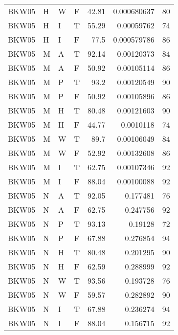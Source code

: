 \begin{table}[!htb]
{\begin{tabular}{llllrrr}
            BKW05    & H     & W     & F          & 42.81      & 0.000680637 & 80       \\
            BKW05    & H     & I     & T          & 55.29      & 0.00059762  & 74       \\
            BKW05    & H     & I     & F          & 77.5       & 0.000579786 & 86       \\
            BKW05    & M     & A     & T          & 92.14      & 0.00120373  & 84       \\
            BKW05    & M     & A     & F          & 50.92      & 0.00105114  & 86       \\
            BKW05    & M     & P     & T          & 93.2       & 0.00120549  & 90       \\
            BKW05    & M     & P     & F          & 50.92      & 0.00105896  & 86       \\
            BKW05    & M     & H     & T          & 80.48      & 0.00121603  & 90       \\
            BKW05    & M     & H     & F          & 44.77      & 0.0010118   & 74       \\
            BKW05    & M     & W     & T          & 89.7       & 0.00106049  & 84       \\
            BKW05    & M     & W     & F          & 52.92      & 0.00132608  & 86       \\
            BKW05    & M     & I     & T          & 62.75      & 0.00107346  & 92       \\
            BKW05    & M     & I     & F          & 88.04      & 0.00100088  & 92       \\
            BKW05    & N     & A     & T          & 92.05      & 0.177481    & 76       \\
            BKW05    & N     & A     & F          & 62.75      & 0.247756    & 92       \\
            BKW05    & N     & P     & T          & 93.13      & 0.19128     & 72       \\
            BKW05    & N     & P     & F          & 67.88      & 0.276854    & 94       \\
            BKW05    & N     & H     & T          & 80.48      & 0.201295    & 90       \\
            BKW05    & N     & H     & F          & 62.59      & 0.288999    & 92       \\
            BKW05    & N     & W     & T          & 93.56      & 0.193728    & 76       \\
            BKW05    & N     & W     & F          & 59.57      & 0.282892    & 90       \\
            BKW05    & N     & I     & T          & 67.88      & 0.236274    & 94       \\
            BKW05    & N     & I     & F          & 88.04      & 0.156715    & 92       \\
            \hline
        \end{tabular}
    }{}
\end{table}